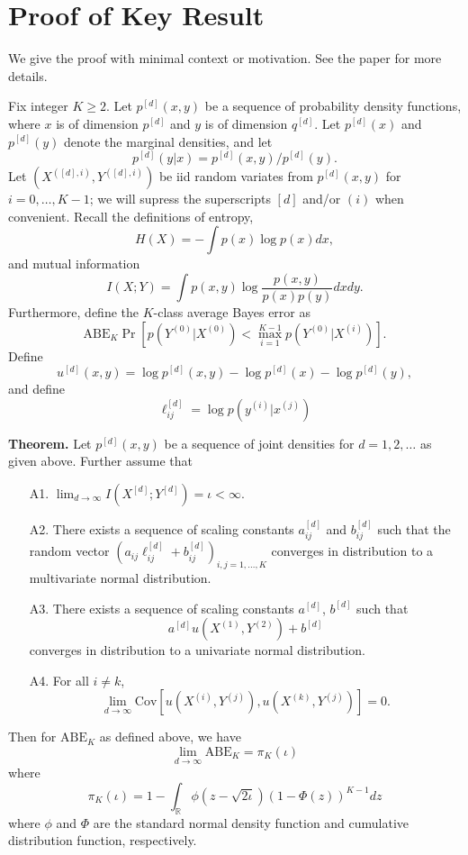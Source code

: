 \documentclass[12pt]{article}
\begin{document}
\maketitle

\newcommand{\tr}{\text{tr}}
\newcommand{\E}{\textbf{E}}
\newcommand{\diag}{\text{diag}}
\newcommand{\argmax}{\text{argmax}}
\newcommand{\Cov}{\text{Cov}}
\newcommand{\Var}{\text{Var}}
\newcommand{\argmin}{\text{argmin}}
\newcommand{\Vol}{\text{Vol}}
\newcommand{\comm}[1]{}

\newcommand{\bx}{\boldsymbol{x}}
\newcommand{\by}{\boldsymbol{y}}
\newcommand{\bX}{\boldsymbol{X}}
\newcommand{\bY}{\boldsymbol{Y}}


\section{Proof of Key Result}

We give the proof with minimal context or motivation.  See the paper
for more details.

Fix integer $K \geq 2$.  Let $p^{[d]}(x,y)$ be a sequence of
probability density functions, where $x$ is of dimension $p^{[d]}$ and
$y$ is of dimension $q^{[d]}$.  Let $p^{[d]}(x)$ and $p^{[d]}(y)$
denote the marginal densities, and let
\[
p^{[d]}(y|x) = p^{[d]}(x, y)/p^{[d]}(y).\]
 Let $(X^{([d], i)}, Y^{([d], i)})$ be
iid random variates from $p^{[d]}(x, y)$ for $i = 0, \hdots, K-1$; we will supress the
superscripts $[d]$ and/or $(i)$ when convenient.  Recall the definitions of
entropy,
\[
H(X) = -\int p(x) \log p(x) dx,
\]
and mutual information
\[
I(X; Y) = \int p(x, y) \log \frac{p(x, y)}{p(x)p(y)} dx dy.
\]
Furthermore, define the $K$-class average Bayes error as
\[
\text{ABE}_K \Pr[p(Y^{(0)}|X^{(0)}) < \max_{i = 1}^{K-1} p(Y^{(0)}|X^{(i)})].
\]
Define
\[
u^{[d]}(x, y) = \log p^{[d]}(x, y) - \log p^{[d]}(x) - \log p^{[d]}(y),
\]
and define
\[
\ell_{ij}^{[d]} = \log p(y^{(i)}|x^{(j)})
\]


\textbf{Theorem.} Let $p^{[d]}(x, y)$ be a sequence of joint densities
for $d = 1,2,\hdots$ as given above.  Further assume that
\begin{itemize}
\item[A1.] $\lim_{d \to \infty} I(X^{[d]}; Y^{[d]}) = \iota < \infty.$
\item[A2.] There exists a sequence of scaling constants $a_{ij}^{[d]}$
and $b_{ij}^{[d]}$ such that the random vector $(a_{ij}\ell_{ij}^{[d]} +
b_{ij}^{[d]})_{i, j = 1,\hdots, K}$ converges in distribution to a
multivariate normal distribution.
\item[A3.] There exists a sequence of scaling constants $a^{[d]}$, $b^{[d]}$ such that
\[
a^{[d]}u(X^{(1)}, Y^{(2)}) + b^{[d]}
\]
converges in distribution to a univariate normal distribution.
\item[A4.] For all $i \neq k$,
\[\lim_{d \to \infty}\Cov[u(X^{(i)}, Y^{(j)}), u(X^{(k)}, Y^{(j)})] = 0.\]
\end{itemize}
Then for $\text{ABE}_K$ as defined above, we have
\[
\lim_{d \to \infty} \text{ABE}_{K} = \pi_K(\iota)
\]
where
\[
\pi_K(\iota) = 1 - \int_{\mathbb{R}} \phi(z - \sqrt{2\iota}) (1 - \Phi(z))^{K-1} dz
\]
where $\phi$ and $\Phi$ are the standard normal density function and
cumulative distribution function, respectively.
\end{document}
